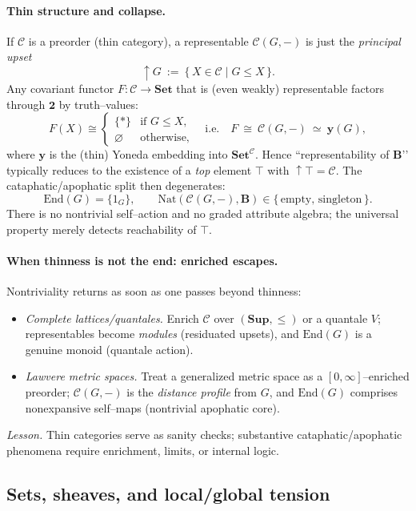 \documentclass[11pt]{article}
\theoremstyle{upright}
\begin{document}
\paragraph{Thin structure and collapse.}
If $\mathcal C$ is a preorder (thin category), a representable $\mathcal C(G,-)$ is just the \emph{principal upset}
\[
\uparrow G\ :=\ \{\,X\in \mathcal C \mid G\le X\,\}.
\]
Any covariant functor $F:\mathcal C\to\mathbf{Set}$ that is (even weakly) representable factors through $\mathbf{2}$ by truth–values:
\[
F(X)\cong
\begin{cases}
\{*\}&\text{if } G\le X,\\
\varnothing&\text{otherwise,}
\end{cases}
\quad\text{i.e.}\quad F\ \cong\ \mathcal C(G,-)\ \simeq\ \mathbf{y}(G),
\]
where $\mathbf y$ is the (thin) Yoneda embedding into $\mathbf{Set}^{\mathcal C}$.
Hence “representability of $\mathbf B$’’ typically reduces to the existence of a \emph{top} element $\top$ with $\uparrow \top=\mathcal C$. The cataphatic/apophatic split then degenerates:
\[
\mathrm{End}(G)=\{1_G\},\qquad
\mathrm{Nat}(\mathcal C(G,-),\mathbf B)\in\{\,\text{empty},\,\text{singleton}\,\}.
\]
There is no nontrivial self–action and no graded attribute algebra; the universal property merely detects reachability of $\top$.

\paragraph{When thinness is not the end: enriched escapes.}
Nontriviality returns as soon as one passes beyond thinness:
\begin{itemize}[leftmargin=2em]
\item \emph{Complete lattices/quantales.} Enrich $\mathcal C$ over $(\mathbf{Sup},\le)$ or a quantale $V$; representables become \emph{modules} (residuated upsets), and $\mathrm{End}(G)$ is a genuine monoid (quantale action).
\item \emph{Lawvere metric spaces.} Treat a generalized metric space as a $[0,\infty]$–enriched preorder; $\mathcal C(G,-)$ is the \emph{distance profile} from $G$, and $\mathrm{End}(G)$ comprises nonexpansive self–maps (nontrivial apophatic core).
\end{itemize}
\emph{Lesson.} Thin categories serve as sanity checks; substantive cataphatic/apophatic phenomena require enrichment, limits, or internal logic.

\subsection{Sets, sheaves, and local/global tension}\label{subsec:set-sheaves}
\end{document}
